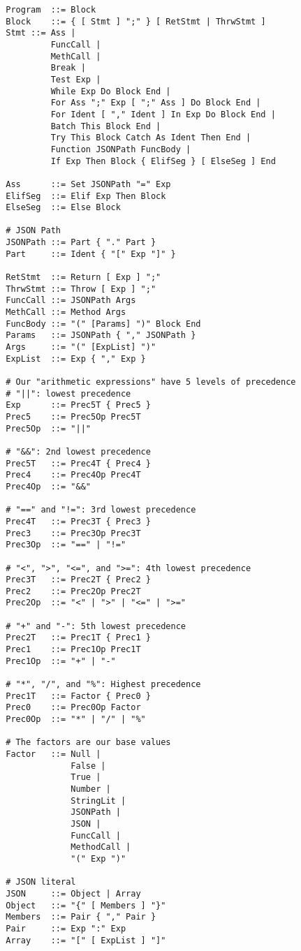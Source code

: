 \documentclass[]{interim}
\theoremstyle{definition}
\begin{document}
\begin{center}
    \begin{verbatim}
        Program  ::= Block
        Block    ::= { [ Stmt ] ";" } [ RetStmt | ThrwStmt ]
        Stmt ::= Ass |
                 FuncCall |
                 MethCall |
                 Break |
                 Test Exp |
                 While Exp Do Block End |
                 For Ass ";" Exp [ ";" Ass ] Do Block End |
                 For Ident [ "," Ident ] In Exp Do Block End |
                 Batch This Block End |
                 Try This Block Catch As Ident Then End |
                 Function JSONPath FuncBody |
                 If Exp Then Block { ElifSeg } [ ElseSeg ] End

        Ass      ::= Set JSONPath "=" Exp
        ElifSeg  ::= Elif Exp Then Block
        ElseSeg  ::= Else Block

        # JSON Path
        JSONPath ::= Part { "." Part }
        Part     ::= Ident { "[" Exp "]" }

        RetStmt  ::= Return [ Exp ] ";"
        ThrwStmt ::= Throw [ Exp ] ";"
        FuncCall ::= JSONPath Args
        MethCall ::= Method Args
        FuncBody ::= "(" [Params] ")" Block End
        Params   ::= JSONPath { "," JSONPath }
        Args     ::= "(" [ExpList] ")"
        ExpList  ::= Exp { "," Exp }

        # Our "arithmetic expressions" have 5 levels of precedence
        # "||": lowest precedence
        Exp      ::= Prec5T { Prec5 }
        Prec5    ::= Prec5Op Prec5T
        Prec5Op  ::= "||"

        # "&&": 2nd lowest precedence
        Prec5T   ::= Prec4T { Prec4 }
        Prec4    ::= Prec4Op Prec4T
        Prec4Op  ::= "&&"

        # "==" and "!=": 3rd lowest precedence
        Prec4T   ::= Prec3T { Prec3 }
        Prec3    ::= Prec3Op Prec3T
        Prec3Op  ::= "==" | "!="

        # "<", ">", "<=", and ">=": 4th lowest precedence
        Prec3T   ::= Prec2T { Prec2 }
        Prec2    ::= Prec2Op Prec2T
        Prec2Op  ::= "<" | ">" | "<=" | ">="

        # "+" and "-": 5th lowest precedence
        Prec2T   ::= Prec1T { Prec1 }
        Prec1    ::= Prec1Op Prec1T
        Prec1Op  ::= "+" | "-"

        # "*", "/", and "%": Highest precedence
        Prec1T   ::= Factor { Prec0 }
        Prec0    ::= Prec0Op Factor
        Prec0Op  ::= "*" | "/" | "%"

        # The factors are our base values
        Factor   ::= Null |
                     False |
                     True |
                     Number |
                     StringLit |
                     JSONPath |
                     JSON |
                     FuncCall |
                     MethodCall |
                     "(" Exp ")"

        # JSON literal
        JSON     ::= Object | Array
        Object   ::= "{" [ Members ] "}"
        Members  ::= Pair { "," Pair }
        Pair     ::= Exp ":" Exp
        Array    ::= "[" [ ExpList ] "]"
    \end{verbatim}
\end{center}
\end{document}
